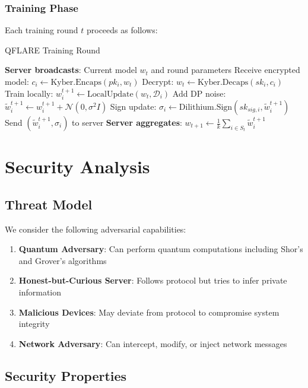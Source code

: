\documentclass[journal,onecolumn,draftclsnofoot]{IEEEtran}
\begin{document}
\subsubsection{Training Phase}
Each training round $t$ proceeds as follows:

\begin{algorithm}
\caption{QFLARE Training Round}
\begin{algorithmic}[1]
\STATE \textbf{Server broadcasts}: Current model $w_t$ and round parameters
    \STATE Receive encrypted model: $c_i \leftarrow \text{Kyber.Encaps}(pk_i, w_t)$
    \STATE Decrypt: $w_t \leftarrow \text{Kyber.Decaps}(sk_i, c_i)$
    \STATE Train locally: $w_i^{t+1} \leftarrow \text{LocalUpdate}(w_t, \mathcal{D}_i)$
    \STATE Add DP noise: $\tilde{w}_i^{t+1} \leftarrow w_i^{t+1} + \mathcal{N}(0, \sigma^2 I)$
    \STATE Sign update: $\sigma_i \leftarrow \text{Dilithium.Sign}(sk_{sig,i}, \tilde{w}_i^{t+1})$
    \STATE Send $(\tilde{w}_i^{t+1}, \sigma_i)$ to server
\ENDFOR
\STATE \textbf{Server aggregates}: $w_{t+1} \leftarrow \frac{1}{k} \sum_{i \in S_t} \tilde{w}_i^{t+1}$
\end{algorithmic}
\end{algorithm}

\section{Security Analysis}

\subsection{Threat Model}

We consider the following adversarial capabilities:

\begin{enumerate}
\item \textbf{Quantum Adversary}: Can perform quantum computations including Shor's and Grover's algorithms
\item \textbf{Honest-but-Curious Server}: Follows protocol but tries to infer private information
\item \textbf{Malicious Devices}: May deviate from protocol to compromise system integrity
\item \textbf{Network Adversary}: Can intercept, modify, or inject network messages
\end{enumerate}

\subsection{Security Properties}
\end{document}
